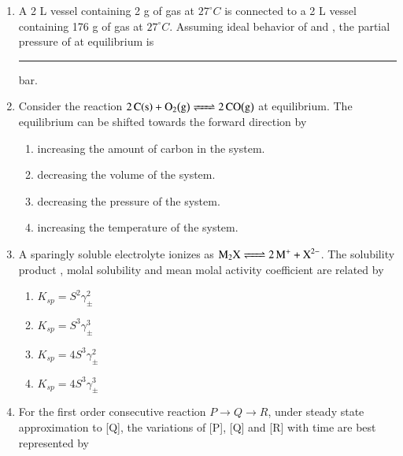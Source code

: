 \documentclass[journal,12pt,onecolumn]{IEEEtran}
\theoremstyle{remark}
\begin{document}
\begin{enumerate}
\item A 2 L vessel containing 2 g of  gas at $27^{\circ}C$ is connected to a 2 L vessel containing 176 g of  gas at $27^{\circ}C$. Assuming ideal behavior of  and , the partial pressure of  at equilibrium is \rule{1cm}{0.15mm} bar.
\hfill{}



\item Consider the reaction $\ce{2C\brak{s} + O2\brak{g} <=> 2CO\brak{g}}$ at equilibrium. The equilibrium can be shifted towards the forward direction by
    \begin{enumerate}
        \item increasing the amount of carbon in the system.
        \item decreasing the volume of the system.
        \item decreasing the pressure of the system.
        \item increasing the temperature of the system.
        \hfill{}
    \end{enumerate}



\item A sparingly soluble electrolyte  ionizes as $\ce{M2X <=> 2M+ + X^{2-}}$. The solubility product , molal solubility  and mean molal activity coefficient \brak{\gamma_{\pm}} are related by
    \begin{enumerate}
        \item $K_{sp}=S^{2}\gamma_{\pm}^{2}$
        \item $K_{sp}=S^{3}\gamma_{\pm}^{3}$
        \item $K_{sp}=4S^{3}\gamma_{\pm}^{2}$
        \item $K_{sp}=4S^{3}\gamma_{\pm}^{3}$
        \hfill{}
    \end{enumerate}



\item For the first order consecutive reaction $P\rightarrow Q\rightarrow R$, under steady state approximation to [Q], the variations of [P], [Q] and [R] with time are best represented by
    \begin{enumerate}
        

\end{enumerate}
\end{enumerate}
\end{document}
